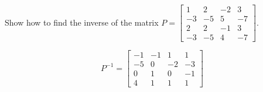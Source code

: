 
\begin{exerciseStatement}


Show how to find the inverse of the matrix \(P= \left[\begin{array}{cccc}
1 & 2 & -2 & 3 \\
-3 & -5 & 5 & -7 \\
2 & 2 & -1 & 3 \\
-3 & -5 & 4 & -7
\end{array}\right] \).


\end{exerciseStatement}
    
\begin{exerciseAnswer} 
\[P^{-1}= \left[\begin{array}{cccc}
-1 & -1 & 1 & 1 \\
-5 & 0 & -2 & -3 \\
0 & 1 & 0 & -1 \\
4 & 1 & 1 & 1
\end{array}\right] \]
\end{exerciseAnswer}
    
